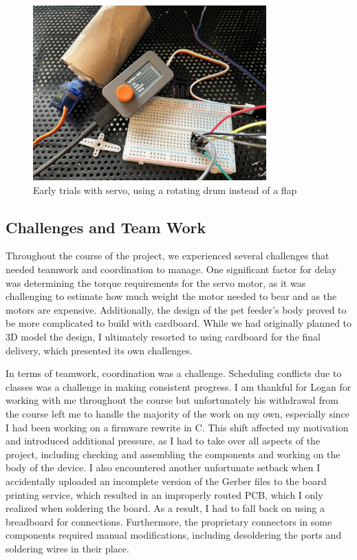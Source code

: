 \documentclass[12pt]{article}
\begin{document}
\begin{figure}[H]
    \centering
    \includegraphics[width=0.8\textwidth]{parts.jpg}
    \caption{Early trials with servo, using a rotating drum instead of a flap}
\end{figure}


\subsection{Challenges and Team Work}
Throughout the course of the project, we experienced several challenges that needed teamwork and coordination to manage. One significant factor for delay was determining the torque requirements for the servo motor, as it was challenging to estimate how much weight the motor needed to bear and as the motors are expensive. Additionally, the design of the pet feeder's body proved to be more complicated to build with cardboard. While we had originally planned to 3D model the design, I ultimately resorted to using cardboard for the final delivery, which presented its own challenges.

In terms of teamwork, coordination was a challenge. Scheduling conflicts due to classes was a challenge in making consistent progress. I am thankful for Logan for working with me throughout the course but unfortunately his withdrawal from the course left me to handle the majority of the work on my own, especially since I had been working on a firmware rewrite in C. This shift affected my motivation and introduced additional pressure, as I had to take over all aspects of the project, including checking and assembling the components and working on the body of the device. I also encountered another unfortunate setback when I accidentally uploaded an incomplete version of the Gerber files to the board printing service, which resulted in an improperly routed PCB, which I only realized when soldering the board. As a result, I had to fall back on using a breadboard for connections. Furthermore, the proprietary connectors in some components required manual modifications, including desoldering the ports and soldering wires in their place.
\end{document}
